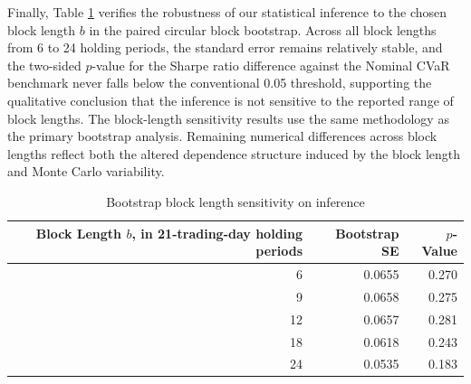 \documentclass[smallextended]{svjour3}
\begin{document}
\begin{table}[htbp]
\centering
\caption{Out-of-sample performance across ESS thresholds ($E_{\min}$)}
\label{tab:ess_backtest}
\end{table}

Finally, Table \ref{tab:sens_block} verifies the robustness of our statistical inference to the chosen block length $b$ in the paired circular block bootstrap. Across all block lengths from 6 to 24 holding periods, the standard error remains relatively stable, and the two-sided $p$-value for the Sharpe ratio difference against the Nominal CVaR benchmark never falls below the conventional 0.05 threshold, supporting the qualitative conclusion that the inference is not sensitive to the reported range of block lengths. The block-length sensitivity results use the same methodology as the primary bootstrap analysis. Remaining numerical differences across block lengths reflect both the altered dependence structure induced by the block length and Monte Carlo variability.

\begin{table}[htbp]
\centering
\caption{Bootstrap block length sensitivity on inference}
\label{tab:sens_block}
\begin{tabular}{rrr}
\toprule
\textbf{Block Length $b$, in 21-trading-day holding periods} & \textbf{Bootstrap SE} & \textbf{$p$-Value} \\
\midrule
6 & 0.0655 & 0.270 \\
9 & 0.0658 & 0.275 \\
12 & 0.0657 & 0.281 \\
18 & 0.0618 & 0.243 \\
24 & 0.0535 & 0.183 \\
\bottomrule
\end{tabular}
\end{table}
\end{document}
